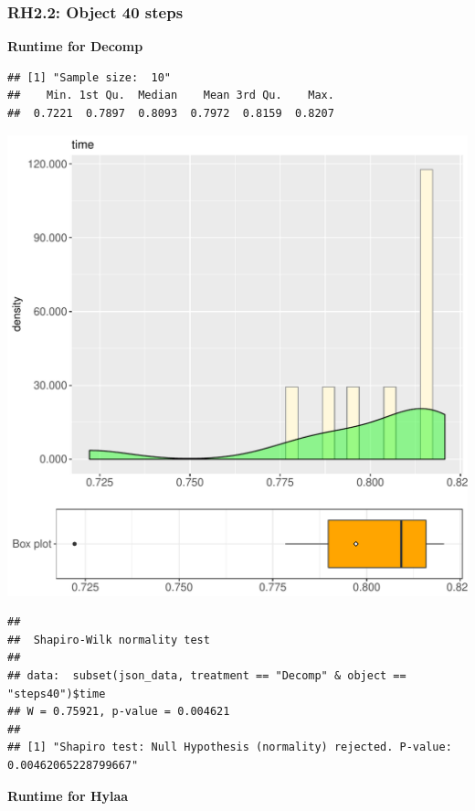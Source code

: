 \documentclass{article}\usepackage[]{graphicx}\usepackage[]{color}
\makeatletter
\def\maxwidth{ %
  \ifdim\Gin@nat@width>\linewidth
    \linewidth
  \else
    \Gin@nat@width
  \fi
}
\newenvironment{kframe}{%
 \def\at@end@of@kframe{}%
 \ifinner\ifhmode%
  \def\at@end@of@kframe{\end{minipage}}%
  \begin{minipage}{\columnwidth}%
 \fi\fi%
 \def\FrameCommand##1{\hskip\@totalleftmargin \hskip-\fboxsep
 \colorbox{shadecolor}{##1}\hskip-\fboxsep
     \hskip-\linewidth \hskip-\@totalleftmargin \hskip\columnwidth}%
 \MakeFramed {\advance\hsize-\width
   \@totalleftmargin\z@ \linewidth\hsize
   \@setminipage}}%
 {\par\unskip\endMakeFramed%
 \at@end@of@kframe}
\newenvironment{knitrout}{}{} %
\makeatother
\begin{document}
\subsubsection{RH2.2: Object 40 steps}

 \textbf{Runtime for Decomp}
\begin{knitrout}
\color{fgcolor}\begin{kframe}
\begin{verbatim}
## [1] "Sample size:  10"
##    Min. 1st Qu.  Median    Mean 3rd Qu.    Max. 
##  0.7221  0.7897  0.8093  0.7972  0.8159  0.8207
\end{verbatim}
\end{kframe}
\includegraphics[width=\maxwidth]{figure/RH2_Decomp_steps40-1} 
\begin{kframe}\begin{verbatim}
## 
## 	Shapiro-Wilk normality test
## 
## data:  subset(json_data, treatment == "Decomp" & object == "steps40")$time
## W = 0.75921, p-value = 0.004621
## 
## [1] "Shapiro test: Null Hypothesis (normality) rejected. P-value: 0.00462065228799667"
\end{verbatim}
\end{kframe}
\end{knitrout}
 \textbf{Runtime for Hylaa}
\end{document}
